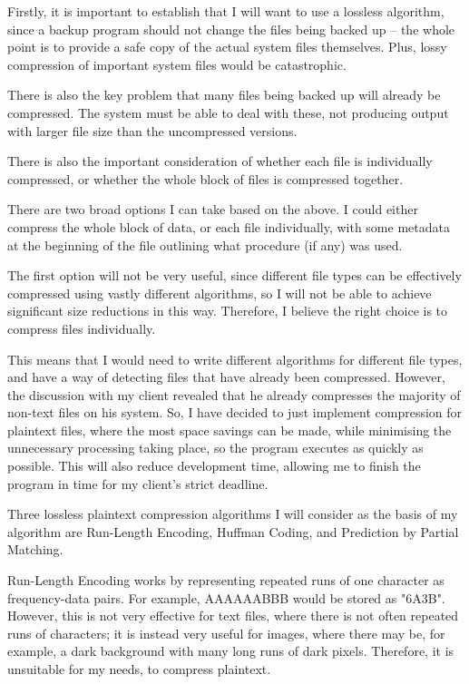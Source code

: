 \documentclass[../main.tex]{subfiles}
\begin{document}
Firstly, it is important to establish that I will want to use a lossless algorithm, since a backup program should not change the files being backed up – the whole point is to provide a safe copy of the actual system files themselves. Plus, lossy compression of important system files would be catastrophic. 

There is also the key problem that many files being backed up will already be compressed. The system must be able to deal with these, not producing output with larger file size than the uncompressed versions. 

There is also the important consideration of whether each file is individually compressed, or whether the whole block of files is compressed together. 

There are two broad options I can take based on the above. I could either compress the whole block of data, or each file individually, with some metadata at the beginning of the file outlining what procedure (if any) was used.

The first option will not be very useful, since different file types can be effectively compressed using vastly different algorithms, so I will not be able to achieve significant size reductions in this way. Therefore, I believe the right choice is to compress files individually. 

This means that I would need to write different algorithms for different file types, and have a way of detecting files that have already been compressed. However, the discussion with my client revealed that he already compresses the majority of non-text files on his system. So, I have decided to just implement compression for plaintext files, where the most space savings can be made, while minimising the unnecessary processing taking place, so the program executes as quickly as possible. This will also reduce development time, allowing me to finish the program in time for my client’s strict deadline. 

Three lossless plaintext compression algorithms I will consider as the basis of my algorithm are Run-Length Encoding, Huffman Coding, and Prediction by Partial Matching.

Run-Length Encoding works by representing repeated runs of one character as frequency-data pairs. For example, AAAAAABBB would be stored as "6A3B". However, this is not very effective for text files, where there is not often repeated runs of characters; it is instead very useful for images, where there may be, for example, a dark background with many long runs of dark pixels. Therefore, it is unsuitable for my needs, to compress plaintext.
\end{document}

